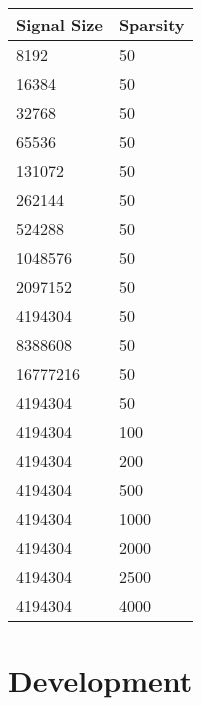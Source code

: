 \documentclass[letterpaper,10pt,english]{sphinxmanual}
\begin{document}
\begin{tabulary}{\linewidth}{|L|L|}
\hline
\textbf{
Signal Size
} & \textbf{
Sparsity
}\\\hline

8192
 & 
50
\\\hline

16384
 & 
50
\\\hline

32768
 & 
50
\\\hline

65536
 & 
50
\\\hline

131072
 & 
50
\\\hline

262144
 & 
50
\\\hline

524288
 & 
50
\\\hline

1048576
 & 
50
\\\hline

2097152
 & 
50
\\\hline

4194304
 & 
50
\\\hline

8388608
 & 
50
\\\hline

16777216
 & 
50
\\\hline

4194304
 & 
50
\\\hline

4194304
 & 
100
\\\hline

4194304
 & 
200
\\\hline

4194304
 & 
500
\\\hline

4194304
 & 
1000
\\\hline

4194304
 & 
2000
\\\hline

4194304
 & 
2500
\\\hline

4194304
 & 
4000
\\\hline
\end{tabulary}



\chapter{Development}
\label{development:development}\label{development::doc}\label{development:id1}
\end{document}

